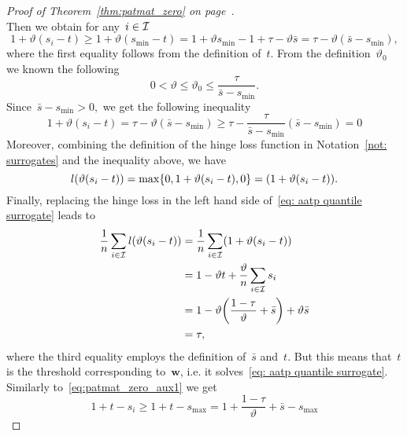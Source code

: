 \begin{proof}[Proof of Theorem~\ref{thm:patmat_zero} on page~\pageref{thm:patmat_zero}]
\begin{equation*}
  \end{equation*}
  Then we obtain for any~$i \in \mathcal{I}$
  \begin{equation*}
    1 + \vartheta(s_i - t)
      \ge 1 + \vartheta(s_{\min} - t)
      = 1 + \vartheta s_{\min} - 1 + \tau - \vartheta\bar{s}
      = \tau - \vartheta (\bar{s} - s_{\min}),
  \end{equation*}
  where the first equality follows from the definition of~$t.$ From the definition~$\vartheta_0$ we known the following
  \begin{equation*}
    0 < \vartheta \le \vartheta_0 \le \frac{\tau}{\bar{s} - s_{\min}}.
  \end{equation*}
  Since~$\bar{s} - s_{\min} > 0,$ we get the following inequality
  \begin{equation}\label{eq:patmat_zero_aux1}
    1 + \vartheta(s_i - t)
      = \tau - \vartheta (\bar{s} - s_{\min})
      \ge \tau - \frac{\tau}{\bar{s} - s_{\min}} (\bar{s} - s_{\min})
      = 0
  \end{equation}
  Moreover, combining the definition of the hinge loss function in Notation~\ref{not: surrogates} and the inequality above, we have
  \begin{equation*}
    l\Brac{\vartheta (s_i - t)} = \max\{0, 1 + \vartheta (s_i - t), 0\} = \Brac{1 + \vartheta(s_i - t)}.
  \end{equation*}
  Finally, replacing the hinge loss in the left hand side of~\eqref{eq: aatp quantile surrogate} leads to
  \begin{equation*}
    \begin{aligned}
      \frac{1}{n} \sum_{i \in \I} l\Brac{\vartheta (s_i - t)}
      & = \frac{1}{n}\sum_{i \in \I}\Brac{1 + \vartheta(s_i - t)} \\
      & = 1 - \vartheta t + \frac{\vartheta}{n} \sum_{i \in \I} s_i \\
      & = 1 - \vartheta \Brac{\frac{1 - \tau}{\vartheta} + \bar{s}} + \vartheta \bar{s} \\
      & = \tau,
    \end{aligned}
  \end{equation*}
  where the third equality employs the definition of~$\bar{s}$ and~$t$. But this means that~$t$ is the threshold corresponding to~$\bm{w}$, i.e. it solves~\eqref{eq: aatp quantile surrogate}. Similarly to~\eqref{eq:patmat_zero_aux1} we get
  \begin{equation}\label{eq:patmat_zero_aux2}
    1 + t - s_i
    \ge 1 + t-s_{\max}
    =   1 + \frac{1-\tau}{\vartheta} + \bar{s} - s_{\max}

\end{equation}
\end{proof}
